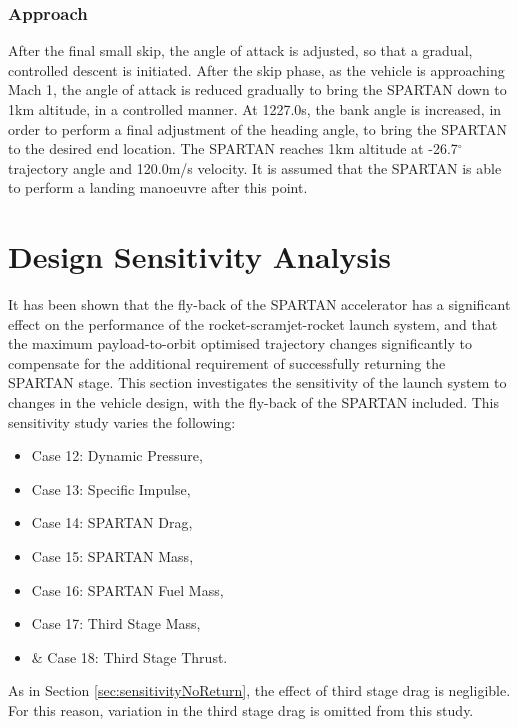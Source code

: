 \subsubsection{ Approach}

After the final small skip, the angle of attack is adjusted, so that a gradual, controlled descent is initiated. 
After the skip phase, as the vehicle is approaching Mach 1, the angle of attack is reduced gradually to bring the SPARTAN down to 1km altitude, in a controlled manner. At 1227.0s, the bank angle is increased, in order to perform a final adjustment of the heading angle, to bring the SPARTAN to the desired end location. 
The SPARTAN reaches 1km altitude at -26.7$^\circ$ trajectory angle and 120.0m/s velocity. It is assumed that the SPARTAN is able to perform a landing manoeuvre after this point. 








\section{Design Sensitivity Analysis}\label{sec:sensitivity}

It has been shown that the fly-back of the SPARTAN accelerator has a significant effect on the performance of the rocket-scramjet-rocket launch system, and that the maximum payload-to-orbit optimised trajectory changes significantly to compensate for the additional requirement of successfully returning the SPARTAN stage. This section investigates the sensitivity of the launch system to changes in the vehicle design, with the fly-back of the SPARTAN included. This sensitivity study varies the following:
\begin{itemize}
	\item Case 12: Dynamic Pressure, 
	\item Case 13: Specific Impulse,
	\item Case 14: SPARTAN Drag,
	\item Case 15: SPARTAN Mass,
	\item Case 16: SPARTAN Fuel Mass,
	\item Case 17: Third Stage Mass,
	\item \& Case 18: Third Stage Thrust.
\end{itemize}
As in Section \ref{sec:sensitivityNoReturn}, the effect of third stage drag is negligible. For this reason, variation in the third stage drag is omitted from this study. 

